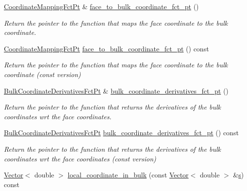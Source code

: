 \begin{DoxyCompactItemize}
\hyperlink{classoomph_1_1FaceElement_aaa3af8b5d2e9584bdcd9b133990d7591}{Coordinate\+Mapping\+Fct\+Pt} \& \hyperlink{classoomph_1_1FaceElement_a284064de90f834ec3a877d49bdee759a}{face\+\_\+to\+\_\+bulk\+\_\+coordinate\+\_\+fct\+\_\+pt} ()
\begin{DoxyCompactList}\small\item\em Return the pointer to the function that maps the face coordinate to the bulk coordinate. \end{DoxyCompactList}\item 
\hyperlink{classoomph_1_1FaceElement_aaa3af8b5d2e9584bdcd9b133990d7591}{Coordinate\+Mapping\+Fct\+Pt} \hyperlink{classoomph_1_1FaceElement_a2168997e5ea9064d74e1c9ad220eba69}{face\+\_\+to\+\_\+bulk\+\_\+coordinate\+\_\+fct\+\_\+pt} () const
\begin{DoxyCompactList}\small\item\em Return the pointer to the function that maps the face coordinate to the bulk coordinate (const version) \end{DoxyCompactList}\item 
\hyperlink{classoomph_1_1FaceElement_a67356b9329923767ab8f13fed85f7f88}{Bulk\+Coordinate\+Derivatives\+Fct\+Pt} \& \hyperlink{classoomph_1_1FaceElement_abac8bdefea177d3a6f3a89ebbaf4ed4a}{bulk\+\_\+coordinate\+\_\+derivatives\+\_\+fct\+\_\+pt} ()
\begin{DoxyCompactList}\small\item\em Return the pointer to the function that returns the derivatives of the bulk coordinates wrt the face coordinates. \end{DoxyCompactList}\item 
\hyperlink{classoomph_1_1FaceElement_a67356b9329923767ab8f13fed85f7f88}{Bulk\+Coordinate\+Derivatives\+Fct\+Pt} \hyperlink{classoomph_1_1FaceElement_a42c2096f5c785657c3a09edce458296a}{bulk\+\_\+coordinate\+\_\+derivatives\+\_\+fct\+\_\+pt} () const
\begin{DoxyCompactList}\small\item\em Return the pointer to the function that returns the derivatives of the bulk coordinates wrt the face coordinates (const version) \end{DoxyCompactList}\item 
\hyperlink{classoomph_1_1Vector}{Vector}$<$ double $>$ \hyperlink{classoomph_1_1FaceElement_a5dd56d5b438c316aca9efa815441b74d}{local\+\_\+coordinate\+\_\+in\+\_\+bulk} (const \hyperlink{classoomph_1_1Vector}{Vector}$<$ double $>$ \&\hyperlink{cfortran_8h_ab7123126e4885ef647dd9c6e3807a21c}{s}) const

\end{DoxyCompactItemize}
